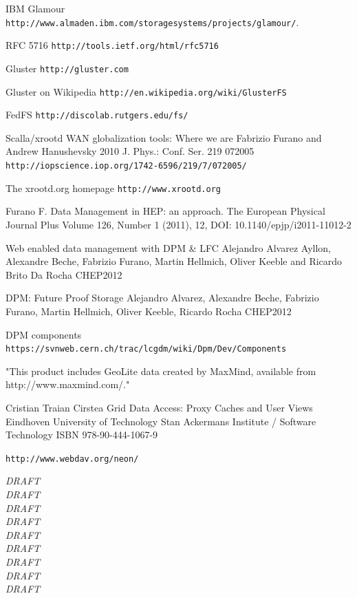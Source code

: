 \documentclass[12pt]{article} %
\begin{document}
\begin{thebibliography}{9}

 IBM Glamour \verb"http://www.almaden.ibm.com/storagesystems/projects/glamour/". 


 RFC 5716
\verb"http://tools.ietf.org/html/rfc5716"


 Gluster
\verb"http://gluster.com"

 Gluster on Wikipedia
\verb"http://en.wikipedia.org/wiki/GlusterFS"


 FedFS
\verb"http://discolab.rutgers.edu/fs/"

 Scalla/xrootd WAN globalization tools: Where we are
Fabrizio Furano and Andrew Hanushevsky 2010 J. Phys.: Conf. Ser. 219 072005
\verb"http://iopscience.iop.org/1742-6596/219/7/072005/"

 The xrootd.org homepage
\verb"http://www.xrootd.org"

Furano F. Data Management in HEP: an approach. 
The European Physical Journal Plus
Volume 126, Number 1 (2011), 12, DOI: 10.1140/epjp/i2011-11012-2

Web enabled data management with DPM \& LFC
Alejandro Alvarez Ayllon, Alexandre Beche, Fabrizio Furano, Martin Hellmich, Oliver Keeble and Ricardo Brito Da Rocha
CHEP2012

DPM: Future Proof Storage
Alejandro Alvarez, Alexandre Beche, Fabrizio Furano, Martin Hellmich, Oliver Keeble, Ricardo Rocha
CHEP2012

 DPM components
\verb"https://svnweb.cern.ch/trac/lcgdm/wiki/Dpm/Dev/Components"

"This product includes GeoLite data created by MaxMind, available from http://www.maxmind.com/."

Cristian Traian Cirstea
Grid Data Access: Proxy Caches and User Views
Eindhoven University of Technology
Stan Ackermans Institute / Software Technology
ISBN 978-90-444-1067-9


\verb"http://www.webdav.org/neon/"

\end{thebibliography}


\emph{DRAFT}\\

\emph{DRAFT}\\

\emph{DRAFT}\\

\emph{DRAFT}\\

\emph{DRAFT}\\

\emph{DRAFT}\\

\emph{DRAFT}\\

\emph{DRAFT}\\

\emph{DRAFT}\\
\end{document}

